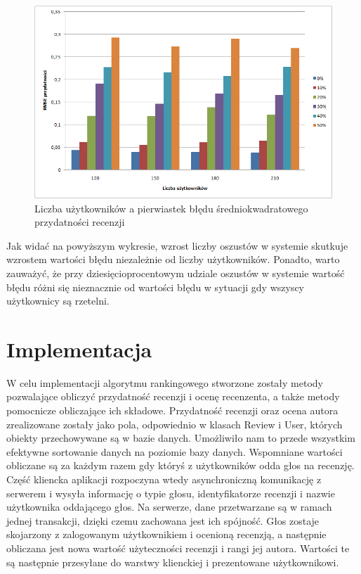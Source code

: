 \begin{figure}[h]
	\centering
	\includegraphics[width=\textwidth, keepaspectratio=true]{images/LiarsTest.png}
	\caption{Liczba użytkowników a pierwiastek błędu średniokwadratowego przydatności recenzji}\label{fig:test3}
\end{figure}

Jak widać na powyższym wykresie, wzrost liczby oszustów w systemie skutkuje wzrostem wartości błędu niezależnie od liczby użytkowników. Ponadto, warto zauważyć, że przy dziesięcioprocentowym udziale oszustów w systemie wartość błędu różni się nieznacznie od wartości błędu w sytuacji gdy wszyscy użytkownicy są rzetelni.

\section{Implementacja}

W celu implementacji algorytmu rankingowego stworzone zostały metody pozwalające obliczyć przydatność recenzji i ocenę recenzenta, a także metody pomocnicze obliczające ich składowe. Przydatność recenzji oraz ocena autora zrealizowane zostały jako pola, odpowiednio w klasach Review i User, których obiekty przechowywane są w bazie danych. Umożliwiło nam to przede wszystkim efektywne sortowanie danych na poziomie bazy danych. Wspomniane wartości obliczane są za każdym razem gdy któryś z użytkowników odda głos na recenzję. Część kliencka aplikacji rozpoczyna wtedy asynchroniczną komunikację z serwerem i wysyła informację o typie głosu, identyfikatorze recenzji i nazwie użytkownika oddającego głos. Na serwerze, dane przetwarzane są w ramach jednej transakcji\cite{springAction}, dzięki czemu zachowana jest ich spójność. Głos zostaje skojarzony z zalogowanym użytkownikiem i ocenioną recenzją, a następnie obliczana jest nowa wartość użyteczności recenzji i rangi jej autora. Wartości te są następnie przesyłane do warstwy klienckiej i  prezentowane użytkownikowi.

